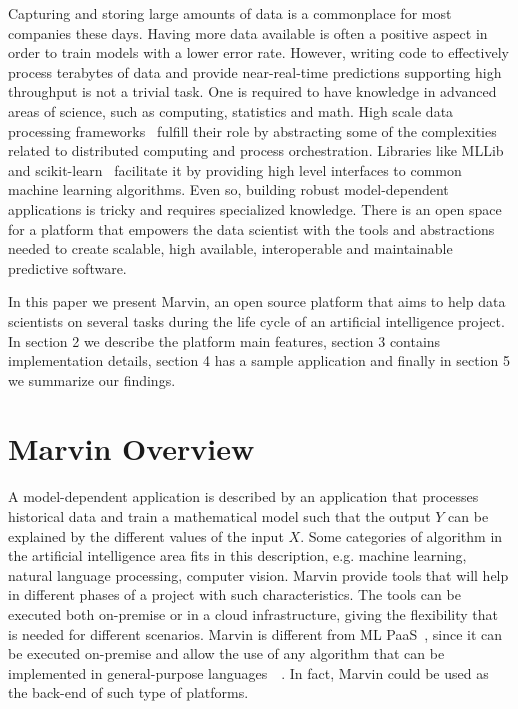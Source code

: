 \documentclass[twoside,11pt]{article}
\begin{document}
Capturing and storing large amounts of data is a commonplace for most companies these days. Having more data available is often a positive aspect in order to train models with a lower error rate. However, writing code to effectively process terabytes of data and provide near-real-time predictions supporting high throughput is not a trivial task. One is required to have knowledge in advanced areas of science, such as computing, statistics and math. High scale data processing frameworks~\citep{zaharia2010spark} fulfill their role by abstracting some of the complexities related to distributed computing and process orchestration. Libraries like MLLib~\citep{meng2015ml} and scikit-learn~\citep{pedregosa2011scikit} facilitate it by providing high level interfaces to common machine learning algorithms. Even so, building robust model-dependent applications is tricky and requires specialized knowledge. There is an open space for a platform that empowers the data scientist with the tools and abstractions needed to create scalable, high available, interoperable and maintainable predictive software. 

In this paper we present Marvin, an open source platform that aims to help data scientists on several tasks during the life cycle of an artificial intelligence project. In section 2 we describe the platform main features, section 3 contains implementation details, section 4 has a sample application and finally in section 5 we summarize our findings.

\section{Marvin Overview}

A model-dependent application is described by an application that processes historical data and train a mathematical model such that the output $Y$ can be explained by the different values of the input $X$. Some categories of algorithm in the artificial intelligence area fits in this description, e.g. machine learning, natural language processing, computer vision. Marvin provide tools that will help in different phases of a project with such characteristics. The tools can be executed both on-premise or in a cloud infrastructure, giving the flexibility that is needed for different scenarios. Marvin is different from ML PaaS~\citep{pmlr-v50-azureml15}, since it can be executed on-premise and allow the use of any algorithm that can be implemented in general-purpose languages~\citep{van2003python}~\citep{odersky2004scala}. In fact, Marvin could be used as the back-end of such type of platforms.
\end{document}
